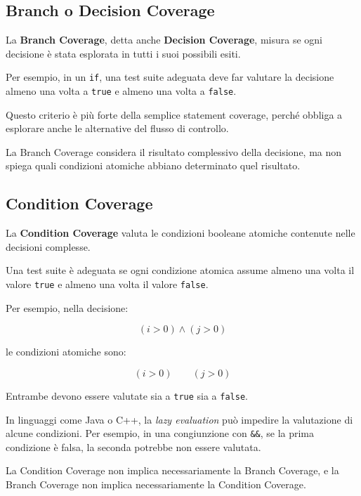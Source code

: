 \subsection{Branch o Decision Coverage}

La \textbf{Branch Coverage}, detta anche \textbf{Decision Coverage}, misura se ogni decisione è stata esplorata in tutti i suoi possibili esiti.

Per esempio, in un \texttt{if}, una test suite adeguata deve far valutare la decisione almeno una volta a \texttt{true} e almeno una volta a \texttt{false}.

Questo criterio è più forte della semplice statement coverage, perché obbliga a esplorare anche le alternative del flusso di controllo.

\begin{notaesame}
La Branch Coverage considera il risultato complessivo della decisione, ma non spiega quali condizioni atomiche abbiano determinato quel risultato.
\end{notaesame}

\subsection{Condition Coverage}

La \textbf{Condition Coverage} valuta le condizioni booleane atomiche contenute nelle decisioni complesse.

Una test suite è adeguata se ogni condizione atomica assume almeno una volta il valore \texttt{true} e almeno una volta il valore \texttt{false}.

Per esempio, nella decisione:

\[
(i > 0) \land (j > 0)
\]

le condizioni atomiche sono:

\[
(i > 0)
\qquad
(j > 0)
\]

Entrambe devono essere valutate sia a \texttt{true} sia a \texttt{false}.

\begin{notaprof}
In linguaggi come Java o C++, la \emph{lazy evaluation} può impedire la valutazione di alcune condizioni. Per esempio, in una congiunzione con \texttt{\&\&}, se la prima condizione è falsa, la seconda potrebbe non essere valutata.
\end{notaprof}

\begin{notaesame}
La Condition Coverage non implica necessariamente la Branch Coverage, e la Branch Coverage non implica necessariamente la Condition Coverage.
\end{notaesame}

